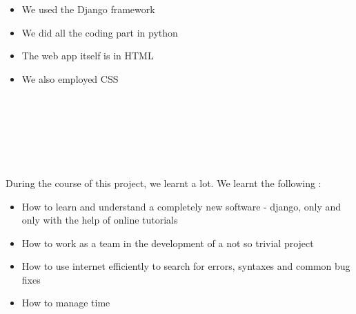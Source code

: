 \documentclass{article}
\begin{document}
\hspace*{5 mm} \\
\hspace*{5 mm} \\
\hspace*{5 mm} \\
\hspace*{5 mm} \\
\hspace*{5 mm}{\LARGE Platforms used in this project : }
\hspace*{5 mm} \\
\begin{itemize}
  \item We used the Django framework
  \item We did all the coding part in python
  \item The web app itself is in HTML
  \item We also employed CSS
  \pagebreak
\end{itemize}
\hspace*{5 mm} \\
\hspace*{5 mm} \\
\hspace*{5 mm} \\
\hspace*{5 mm} \\
\hspace*{5 mm}{\LARGE Things learnt in this project : }
\hspace*{5 mm} \\
\hspace*{5 mm} \\
\hspace*{5 mm} During the course of this project, we learnt a lot. We learnt the following : \\
\begin{itemize}
  \item How to learn and understand a completely new software - django, only and only with the help of online tutorials
  \item How to work as a team in the development of a not so trivial project
  \item How to use internet efficiently to search for errors, syntaxes and common bug fixes
  \item How to manage time
\end{itemize}
\pagebreak
\end{document}
